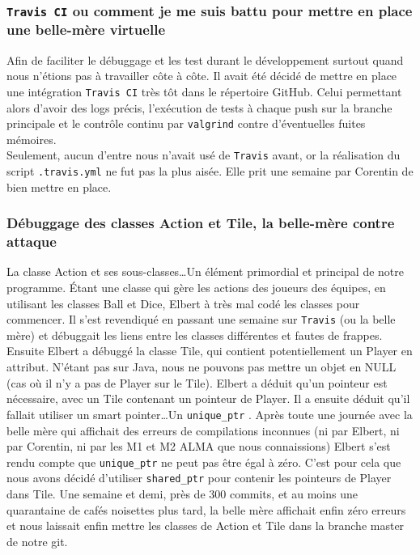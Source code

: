 \documentclass{article}
\newcommand{\info}{\texttt}
\begin{document}
        \subsubsection{\info{Travis CI} ou comment je me suis battu pour mettre en place une belle-mère virtuelle}
        
            Afin de faciliter le débuggage et les test durant le développement surtout quand nous n'étions pas à travailler côte à côte. Il avait été décidé de mettre en place une intégration \info{Travis CI} très tôt dans le répertoire GitHub. Celui permettant alors d'avoir des logs précis, l'exécution de tests à chaque push sur la branche principale et le contrôle continu par \info{valgrind} contre d'éventuelles fuites mémoires.\\
            Seulement, aucun d'entre nous n'avait usé de \info{Travis} avant, or la réalisation du script \info{.travis.yml} ne fut pas la plus aisée. Elle prit une semaine par Corentin de bien mettre en place.
        
        \subsubsection{Débuggage des classes Action et Tile, la belle-mère contre attaque}
        
            La classe Action et ses sous-classes\dots Un élément primordial et principal de notre programme. Étant une classe qui gère les actions des joueurs des équipes, en utilisant les classes Ball et Dice, Elbert à très mal codé les classes pour commencer. Il s'est revendiqué en passant une semaine sur \info{Travis} (ou la belle mère) et débuggait les liens entre les classes différentes et fautes de frappes. Ensuite Elbert a débuggé la classe Tile, qui contient potentiellement un Player en attribut. N'étant pas sur Java, nous ne pouvons pas mettre un objet en NULL (cas où il n'y a pas de Player sur le Tile). Elbert a déduit qu'un pointeur est nécessaire, avec un Tile contenant un pointeur de Player. Il a ensuite déduit qu'il fallait utiliser un smart pointer\dots Un \info{unique\_ptr} . Après toute une journée avec la belle mère qui affichait des erreurs de compilations inconnues (ni par Elbert, ni par Corentin, ni par les M1 et M2 ALMA que nous connaissions) Elbert s'est rendu compte que \info{unique\_ptr} ne peut pas être égal à zéro. C'est pour cela que nous avons décidé d'utiliser \info{shared\_ptr} pour contenir les pointeurs de Player dans Tile. Une semaine et demi, près de 300 commits, et au moins une quarantaine de cafés noisettes plus tard, la belle mère affichait enfin zéro erreurs et nous laissait enfin mettre les classes de Action et Tile dans la branche master de notre git.
        
\end{document}

